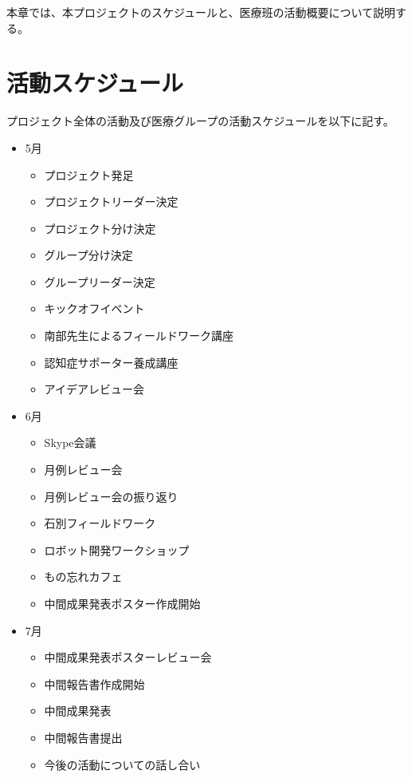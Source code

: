 \documentclass[../report]{subfiles}
\begin{document}
本章では、本プロジェクトのスケジュールと、医療班の活動概要について説明する。

\section{活動スケジュール}
プロジェクト全体の活動及び医療グループの活動スケジュールを以下に記す。
\begin{itemize}
    \item[] 5月
    \begin{itemize}
        \item プロジェクト発足
        \item プロジェクトリーダー決定
        \item プロジェクト分け決定
        \item グループ分け決定
        \item グループリーダー決定
        \item キックオフイベント
        \item 南部先生によるフィールドワーク講座
        \item 認知症サポーター養成講座
        \item アイデアレビュー会
    \end{itemize}
    \item[] 6月
    \begin{itemize}
        \item Skype会議
        \item 月例レビュー会
        \item 月例レビュー会の振り返り
        \item 石別フィールドワーク
        \item ロボット開発ワークショップ
        \item もの忘れカフェ
        \item 中間成果発表ポスター作成開始
    \end{itemize}
    \item[] 7月
    \begin{itemize}
        \item 中間成果発表ポスターレビュー会
        \item 中間報告書作成開始
        \item 中間成果発表
        \item 中間報告書提出
        \item 今後の活動についての話し合い
    \end{itemize}
\end{itemize}
\end{document}
